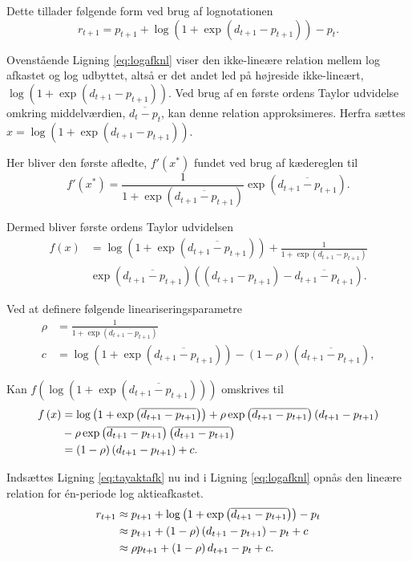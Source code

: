 \documentclass[
  a4paper,
  oneside]{memoir}
\begin{document}
Dette tillader følgende form ved brug af lognotationen
\begin{equation}
r_{t+1}=p_{t+1} +\log\left(1+\exp(d_{t+1}-p_{t+1})\right)-p_t. \label{eq:logafknl}
\end{equation}

Ovenstående Ligning \eqref{eq:logafknl} viser den ikke-lineære relation mellem log afkastet og log udbyttet, altså er det andet led på højreside ikke-lineært, \(\log\left(1+\exp(d_{t+1}-p_{t+1})\right)\). Ved brug af en første ordens Taylor udvidelse omkring middelværdien, \(\overline{d_t-p_t}\), kan denne relation approksimeres. Herfra sættes \(x=\log\left(1+\exp(d_{t+1}-p_{t+1})\right)\).

Her bliver den første afledte, \(f'(x^*)\) fundet ved brug af kædereglen til
\[f'(x^*)=\frac{1}{1+\exp\left(\overline{d_{t+1}-p_{t+1}}\right)}\exp\left(\overline{d_{t+1}-p_{t+1}}\right).\]

Dermed bliver første ordens Taylor udvidelsen
\begin{align*}
f\left(x\right)&=\log\left(1+\exp\left(\overline{d_{t+1}-p_{t+1}}\right)\right)+\frac{1}{1+\exp\left(\overline{d_{t+1}-p_{t+1}}\right)}\\
\quad\quad&\exp\left(\overline{d_{t+1}-p_{t+1}}\right)\left(\left(d_{t+1}-p_{t+1}\right)- \overline{d_{t+1}-p_{t+1}}\right).
\end{align*}

Ved at definere følgende lineariseringsparametre
\begin{align*}
\rho &=\frac{1}{1+\exp\left(\overline{d_{t+1}-p_{t+1}}\right)}\\
c&= \log\left(1+\exp\left(\overline{d_{t+1}-p_{t+1}}\right)\right) - \left(1-\rho\right)\left(\overline{d_{t+1}-p_{t+1}}\right),
\end{align*}

Kan \(f\left(\log\left(1+\exp\left(\overline{d_{t+1}-p_{t+1}}\right)\right)\right)\) omskrives til
\begin{align}
f\left(x\right)&=\log\left(1+\exp\left(\overline{d_{t+1}-p_{t+1}}\right)\right) + \rho\exp\left(\overline{d_{t+1}-p_{t+1}}\right) \left(d_{t+1}-p_{t+1}\right)\notag\\
\quad\quad&-\rho \exp\left(\overline{d_{t+1}-p_{t+1}}\right)\left(\overline{d_{t+1}-p_{t+1}}\right)\notag\\
&=\left(1-\rho\right)\left(d_{t+1}-p_{t+1}\right)+c. \label{eq:tayaktafk}
\end{align}

Indsættes Ligning \eqref{eq:tayaktafk} nu ind i Ligning \eqref{eq:logafknl} opnås den lineære relation for én-periode log aktieafkastet.
\begin{align}
r_{t+1}&\approx p_{t+1} + \log\left(1+\exp\left(\overline{d_{t+1}-p_{t+1}}\right)\right)- p_t \notag\\
&\approx p_{t+1} + \left(1-\rho\right) \left(d_{t+1}-p_{t+1}\right)- p_t + c \notag\\
&\approx \rho p_{t+1} + \left(1-\rho\right) d_{t+1} - p_t + c. \label{eq:tildynggm}
\end{align}
\end{document}
